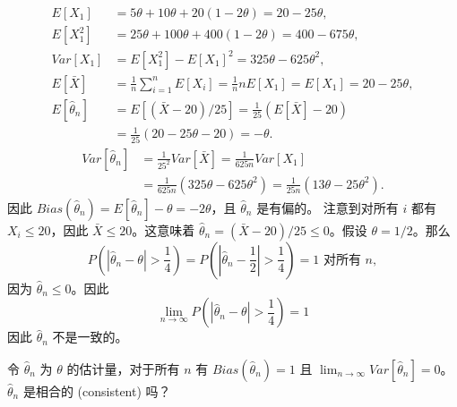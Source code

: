 \begin{questions}
\begin{solution}
\begin{align*}
E[X_1] &= 5\theta + 10\theta + 20(1 - 2\theta) = 20 - 25\theta, \\
E[X_1^2] &= 25\theta + 100\theta + 400(1 - 2\theta) = 400 - 675\theta, \\
Var[X_1] &= E[X_1^2] - E[X_1]^2 = 325\theta - 625\theta^2, \\
E[\bar{X}] &= \frac{1}{n} \sum_{i=1}^n E[X_i] = \frac{1}{n} n E[X_1] = E[X_1] = 20 - 25\theta, \\
E[\hat{\theta}_n] &= E[(\bar{X} - 20)/25] = \frac{1}{25} (E[\bar{X}] - 20) \\
&= \frac{1}{25} (20 - 25\theta - 20) = -\theta.
\end{align*}
\begin{align*}
Var[\hat{\theta}_n] &= \frac{1}{25^2} Var[\bar{X}] = \frac{1}{625n} Var[X_1] \\
&= \frac{1}{625n} (325\theta - 625\theta^2) = \frac{1}{25n} (13\theta - 25\theta^2).
\end{align*}
因此 $Bias(\hat{\theta}_n) = E[\hat{\theta}_n] - \theta = -2\theta$，且 $\hat{\theta}_n$ 是有偏的。
注意到对所有 $i$ 都有 $X_i \le 20$，因此 $\bar{X} \le 20$。这意味着 $\hat{\theta}_n = (\bar{X} - 20)/25 \le 0$。假设 $\theta = 1/2$。那么
\[
P\left( \left| \hat{\theta}_n - \theta \right| > \frac{1}{4} \right) = P\left( \left| \hat{\theta}_n - \frac{1}{2} \right| > \frac{1}{4} \right) = 1 \text{ 对所有 } n,
\]
因为 $\hat{\theta}_n \le 0$。因此
\[
\lim_{n \to \infty} P\left( \left| \hat{\theta}_n - \theta \right| > \frac{1}{4} \right) = 1
\]
因此 $\hat{\theta}_n$ 不是一致的。
\end{solution}

\question 令 $\hat{\theta}_n$ 为 $\theta$ 的估计量，对于所有 $n$ 有 $Bias(\hat{\theta}_n) = 1$ 且 $\lim_{n \to \infty} Var[\hat{\theta}_n] = 0$。$\hat{\theta}_n$ 是相合的 (consistent) 吗？


\end{questions}
